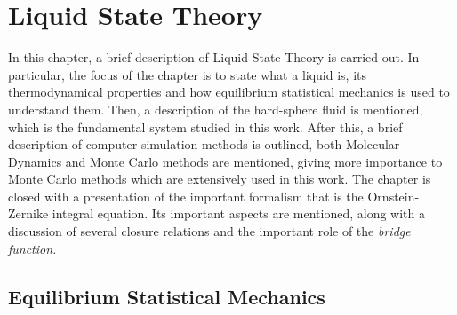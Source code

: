 \chapter{Liquid State Theory}
\label{Cap2}

In this chapter, a brief description of Liquid State Theory is carried out. In particular, 
the focus of the chapter is to state what a liquid is, its thermodynamical properties and
how equilibrium statistical mechanics is used to understand them. Then, a description of 
the hard-sphere fluid is mentioned, which is the fundamental system studied in this work.
After this, a brief description of computer simulation methods is outlined, both
Molecular Dynamics and Monte Carlo methods are mentioned, giving more importance to
Monte Carlo methods which are extensively used in this work.
The chapter is closed with a presentation of the important formalism that is the 
Ornstein-Zernike integral equation. Its important aspects are mentioned, along with
a discussion of several closure relations and the important role of the
\emph{bridge function.}

\section{Equilibrium Statistical Mechanics}
\label{sec:eq-statmech}

